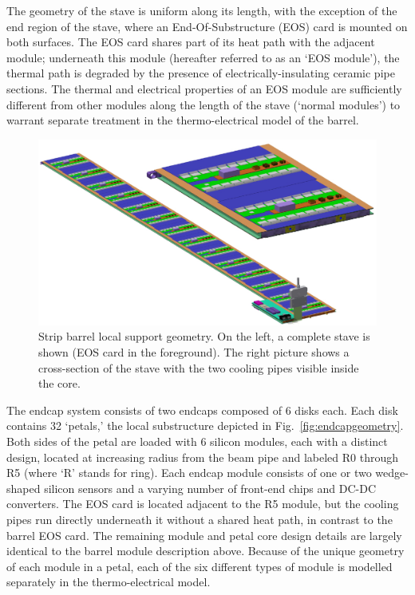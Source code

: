 The geometry of the stave is uniform along its length, with the exception of the end region of the stave, where an End-Of-Substructure (EOS) card is mounted on both surfaces. The EOS card shares part of its heat path with the adjacent module; underneath this module (hereafter referred to as an `EOS module'), the thermal path is degraded by the presence of electrically-insulating ceramic pipe sections. The thermal and electrical properties of an EOS module are sufficiently different from other modules along the length of the stave (`normal modules') to warrant separate treatment in the thermo-electrical model of the barrel. 

\begin{figure}[ht]
\centering
\includegraphics[width=0.8\linewidth]{figures/stave.pdf}
\caption{Strip barrel local support geometry. On the left, a complete stave is shown (EOS card in the foreground). The right picture shows a cross-section of the stave with the two cooling pipes visible inside the core. }
\label{fig:barrelgeometry}
\end{figure}

The endcap system consists of two endcaps composed of 6 disks each.
Each disk contains 32 `petals,' the local substructure depicted in Fig.~\ref{fig:endcapgeometry}.
Both sides of the petal are loaded with 6 silicon modules, each with a distinct design,
located at increasing radius from the beam pipe and labeled R0 through R5 (where `R' stands for ring).
Each endcap module consists of one
or two wedge-shaped silicon sensors and a varying number of front-end chips and DC-DC converters.
The EOS card is located adjacent to the R5 module, but the
cooling pipes run directly underneath it without a shared heat path, in contrast to the barrel EOS card.
The remaining module and petal core design details are largely identical to the barrel module description above.
Because of the unique geometry of each module in a petal, each of the six different types of module is
modelled separately in the thermo-electrical model.

